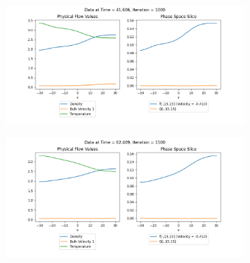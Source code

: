 \documentclass{article}
\begin{document}
\begin{figure}[H]
    \begin{subfigure}[b]{\textwidth}
    \includegraphics[width=\textwidth]{imgs/ts_output2/plots/plot1000.png}
    \end{subfigure}
    \hfill
    \begin{subfigure}[b]{\textwidth}
    \includegraphics[width=\textwidth]{imgs/ts_output2/plots/plot1500.png}
    \end{subfigure}
\end{figure}
\end{document}

